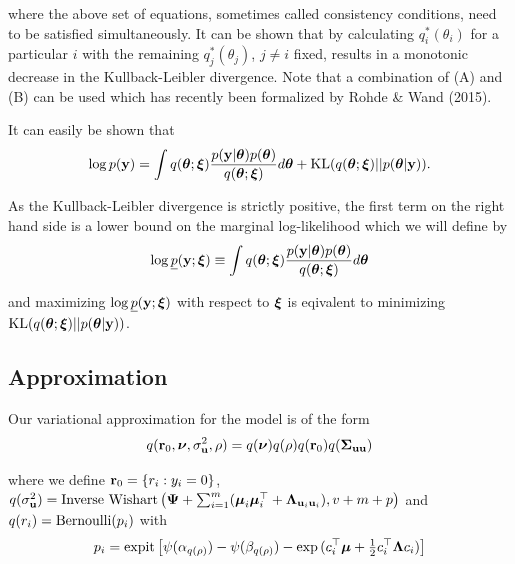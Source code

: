 \documentclass{amsart}[12pt]
\begin{document}
\noindent where the above set of equations, sometimes called consistency conditions, need to be 
satisfied simultaneously. It can be shown that by calculating $q_i^*(\theta_i)$ for a particular
$i$ with the remaining $q_j^*(\theta_j)$, $j\ne i$ fixed, results in a monotonic decrease in the 
Kullback-Leibler divergence. Note that a combination of (A) and (B) can be used which has recently
been formalized by Rohde \& Wand (2015). 

\noindent It can easily be shown that
$$
\displaystyle \log p({\bf y}) = \int q({\boldsymbol \theta};{\boldsymbol \xi})\frac{p({\bf y}|{\boldsymbol \theta})p({\boldsymbol \theta})}{q({\boldsymbol \theta};{\boldsymbol \xi})} d{\boldsymbol \theta} + \text{KL}(q({\boldsymbol \theta};{\boldsymbol \xi})||p({\boldsymbol \theta}|{\bf y})).
$$

\noindent As the Kullback-Leibler divergence is strictly positive, the first term on the right hand side
is a lower bound on the marginal log-likelihood which we will define by
$$
\displaystyle \log \underline{p}({\bf y};{\boldsymbol \xi}) \equiv \int q({\boldsymbol \theta};{\boldsymbol \xi})\frac{p({\bf y}|{\boldsymbol \theta})p({\boldsymbol \theta})}{q({\boldsymbol \theta};{\boldsymbol \xi})} d{\boldsymbol \theta}
$$

\noindent and maximizing $\log \underline{p}({\bf y};{\boldsymbol \xi})$ with respect to ${\boldsymbol \xi}$ is eqivalent to minimizing
$\text{KL}(q({\boldsymbol \theta};{\boldsymbol \xi})||p({\boldsymbol \theta}|{\bf y}))$.


\subsection{Approximation}

Our variational approximation for the model is of the form 
$$
q({\bf r}_0, {\boldsymbol \nu}, \sigma_{{\bf u}}^2, \rho) = q({\boldsymbol \nu})q(\rho) q({\bf r}_0)q({\boldsymbol \Sigma}_{{\bf u} {\bf u}})  \\
$$

\noindent 
where we define ${\bf r}_0 = \{ r_i : y_i = 0 \}$,
$q(\sigma_{{\bf u}}^2) = \mbox{Inverse Wishart}\left({\boldsymbol \Psi} + \sum_{i=1}^m ({\boldsymbol \mu}_i {\boldsymbol \mu}_i^\top + {\boldsymbol \Lambda}_{{\bf u}_i {\bf u}_i}), v + m + 
p\right)$ \mbox{and } $q(r_i) = \text{Bernoulli} (p_i)$ with
$$
p_i = \text{expit} \left[ \psi{(\alpha_{q(\rho)})} - \psi{(\beta_{q(\rho)})} - \exp{(c_i^\top{\boldsymbol\mu}+  \tfrac{1}{2} c_i^\top {\boldsymbol\Lambda}c_i)} \right]
$$
\end{document}
